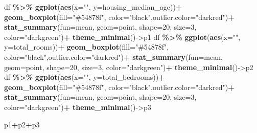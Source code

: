 \documentclass[
]{book}
\newenvironment{Shaded}{\begin{snugshade}}{\end{snugshade}}
\newcommand{\AttributeTok}[1]{\textcolor[rgb]{0.13,0.29,0.53}{#1}}
\newcommand{\DecValTok}[1]{\textcolor[rgb]{0.00,0.00,0.81}{#1}}
\newcommand{\FunctionTok}[1]{\textcolor[rgb]{0.13,0.29,0.53}{\textbf{#1}}}
\newcommand{\NormalTok}[1]{#1}
\newcommand{\OtherTok}[1]{\textcolor[rgb]{0.56,0.35,0.01}{#1}}
\newcommand{\SpecialCharTok}[1]{\textcolor[rgb]{0.81,0.36,0.00}{\textbf{#1}}}
\newcommand{\StringTok}[1]{\textcolor[rgb]{0.31,0.60,0.02}{#1}}
\begin{document}
\begin{Shaded}
\begin{Highlighting}[]
\NormalTok{df }\SpecialCharTok{\%\textgreater{}\%}
  \FunctionTok{ggplot}\NormalTok{(}\FunctionTok{aes}\NormalTok{(}\AttributeTok{x=}\StringTok{""}\NormalTok{, }\AttributeTok{y=}\NormalTok{housing\_median\_age))}\SpecialCharTok{+}
  \FunctionTok{geom\_boxplot}\NormalTok{(}\AttributeTok{fill=}\StringTok{"\#54878f"}\NormalTok{, }\AttributeTok{color=}\StringTok{"black"}\NormalTok{,}\AttributeTok{outlier.color=}\StringTok{"darkred"}\NormalTok{)}\SpecialCharTok{+}
  \FunctionTok{stat\_summary}\NormalTok{(}\AttributeTok{fun=}\NormalTok{mean, }\AttributeTok{geom=}\StringTok{\textquotesingle{}point\textquotesingle{}}\NormalTok{, }\AttributeTok{shape=}\DecValTok{20}\NormalTok{, }\AttributeTok{size=}\DecValTok{3}\NormalTok{, }\AttributeTok{color=}\StringTok{"darkgreen"}\NormalTok{)}\SpecialCharTok{+}
  \FunctionTok{theme\_minimal}\NormalTok{()}\OtherTok{{-}\textgreater{}}\NormalTok{p1}
\NormalTok{df }\SpecialCharTok{\%\textgreater{}\%}
  \FunctionTok{ggplot}\NormalTok{(}\FunctionTok{aes}\NormalTok{(}\AttributeTok{x=}\StringTok{""}\NormalTok{, }\AttributeTok{y=}\NormalTok{total\_rooms))}\SpecialCharTok{+}
  \FunctionTok{geom\_boxplot}\NormalTok{(}\AttributeTok{fill=}\StringTok{"\#54878f"}\NormalTok{, }\AttributeTok{color=}\StringTok{"black"}\NormalTok{,}\AttributeTok{outlier.color=}\StringTok{"darkred"}\NormalTok{)}\SpecialCharTok{+}
  \FunctionTok{stat\_summary}\NormalTok{(}\AttributeTok{fun=}\NormalTok{mean, }\AttributeTok{geom=}\StringTok{\textquotesingle{}point\textquotesingle{}}\NormalTok{, }\AttributeTok{shape=}\DecValTok{20}\NormalTok{, }\AttributeTok{size=}\DecValTok{3}\NormalTok{, }\AttributeTok{color=}\StringTok{"darkgreen"}\NormalTok{)}\SpecialCharTok{+}
  \FunctionTok{theme\_minimal}\NormalTok{()}\OtherTok{{-}\textgreater{}}\NormalTok{p2}
\NormalTok{df }\SpecialCharTok{\%\textgreater{}\%}
  \FunctionTok{ggplot}\NormalTok{(}\FunctionTok{aes}\NormalTok{(}\AttributeTok{x=}\StringTok{""}\NormalTok{, }\AttributeTok{y=}\NormalTok{total\_bedrooms))}\SpecialCharTok{+}
  \FunctionTok{geom\_boxplot}\NormalTok{(}\AttributeTok{fill=}\StringTok{"\#54878f"}\NormalTok{, }\AttributeTok{color=}\StringTok{"black"}\NormalTok{,}\AttributeTok{outlier.color=}\StringTok{"darkred"}\NormalTok{)}\SpecialCharTok{+}
  \FunctionTok{stat\_summary}\NormalTok{(}\AttributeTok{fun=}\NormalTok{mean, }\AttributeTok{geom=}\StringTok{\textquotesingle{}point\textquotesingle{}}\NormalTok{, }\AttributeTok{shape=}\DecValTok{20}\NormalTok{, }\AttributeTok{size=}\DecValTok{3}\NormalTok{, }\AttributeTok{color=}\StringTok{"darkgreen"}\NormalTok{)}\SpecialCharTok{+}
  \FunctionTok{theme\_minimal}\NormalTok{()}\OtherTok{{-}\textgreater{}}\NormalTok{p3}

\NormalTok{p1}\SpecialCharTok{+}\NormalTok{p2}\SpecialCharTok{+}\NormalTok{p3}
\end{Highlighting}
\end{Shaded}
\end{document}

